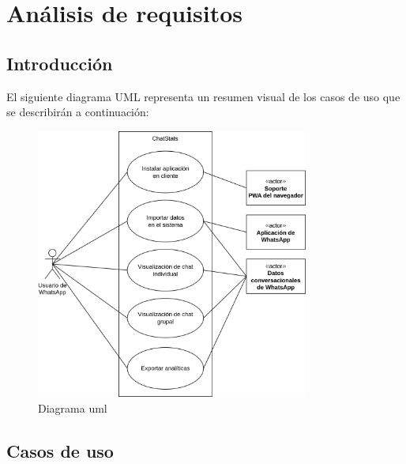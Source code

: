 \chapter{Análisis de requisitos}
\label{chap:use-case}

\section{Introducción}
\label{sec:introduction}

El siguiente diagrama UML representa un resumen visual de los casos de uso que se describirán a continuación: 

\begin{figure}[h]
	\centering
	\includegraphics[width=0.8\textwidth]{img/uml.png}
	\caption{Diagrama \acrshort{uml}}
	\label{fig:chap3:uml}
\end{figure}

\section{Casos de uso}
\label{sec:use-cases}


